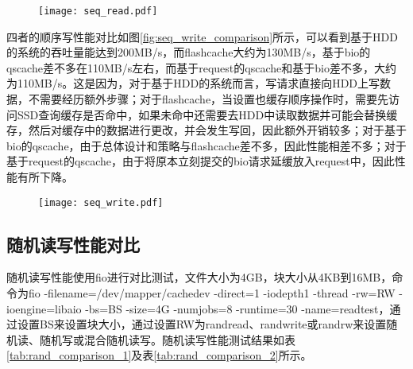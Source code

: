 \begin{figure}[H]
    \centering
    \texttt{[image: seq\_read.pdf]}
\end{figure}

四者的顺序写性能对比如图\ref{fig:seq_write_comparison}所示，可以看到基于HDD的系统的吞吐量能达到200MB/s，而flashcache大约为130MB/s，基于bio的qscache差不多在110MB/s左右，而基于request的qscache和基于bio差不多，大约为110MB/s。这是因为，对于基于HDD的系统而言，写请求直接向HDD上写数据，不需要经历额外步骤；对于flashcache，当设置也缓存顺序操作时，需要先访问SSD查询缓存是否命中，如果未命中还需要去HDD中读取数据并可能会替换缓存，然后对缓存中的数据进行更改，并会发生写回，因此额外开销较多；对于基于bio的qscache，由于总体设计和策略与flashcache差不多，因此性能相差不多；对于基于request的qscache，由于将原本立刻提交的bio请求延缓放入request中，因此性能有所下降。

\begin{figure}[H]
    \centering
    \texttt{[image: seq\_write.pdf]}
\end{figure}

\subsection{随机读写性能对比}

随机读写性能使用fio进行对比测试，文件大小为4GB，块大小从4KB到16MB，命令为fio -filename=/dev/mapper/cachedev -direct=1 -iodepth1 -thread -rw=RW -ioengine=libaio -bs=BS -size=4G -numjobs=8 -runtime=30 -name=readtest，通过设置BS来设置块大小，通过设置RW为randread、randwrite或randrw来设置随机读、随机写或混合随机读写。随机读写性能测试结果如表\ref{tab:rand_comparison_1}及表\ref{tab:rand_comparison_2}所示。

